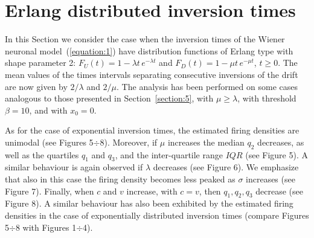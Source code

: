 \section{Erlang distributed inversion times}\label{section:5bis}
In this Section we consider the case when the inversion times of the Wiener neuronal 
model~(\ref{equation:1}) have distribution functions of Erlang type with shape 
parameter 2: $F_U(t)=1-\lambda t\,e^{-\lambda t}$ and $F_D(t)=1-\mu t\,e^{-\mu t}$, 
$t\geq 0$. The mean values of the times intervals separating consecutive 
inversions of the drift are now given by $2/\lambda$ and $2/\mu$. The analysis has 
been performed on some cases analogous to those presented in Section~\ref{section:5}, 
with $\mu\geq\lambda$, with threshold $\beta=10$, and with $x_0=0$. 
\par
As for the case of exponential inversion times, the estimated firing densities are 
unimodal (see Figures 5$\div$8). Moreover, if $\mu$ increases the median $q_2$ 
decreases, as well as the quartiles $q_1$ and $q_3$, and the inter-quartile range 
$IQR$ (see Figure 5). A similar behaviour is again observed if $\lambda$ 
decreases (see Figure 6). We emphasize that also in this case the firing density 
becomes less peaked as $\sigma$ increases (see Figure 7). Finally, when $c$ and $v$ 
increase, with $c=v$, then $q_1,q_2,q_3$ decrease (see Figure 8). A similar behaviour 
has also been exhibited by the estimated firing densities in the case of exponentially 
distributed inversion times (compare Figures 5$\div$8 with Figures 1$\div$4). 
\begin{figure} 
\end{figure}
%
